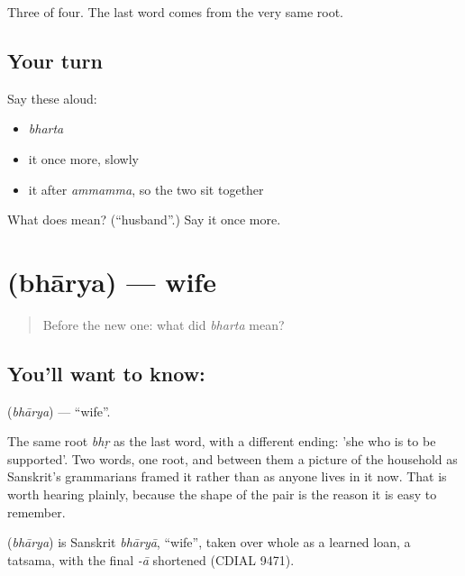 \begin{grammarlens}[title={What you've built}]
Three of four. The last word comes from the very same root.
\end{grammarlens}

\subsection*{Your turn}
Say these aloud:

\begin{itemize}
\raggedright
  \item \emph{bharta}
  \item it once more, slowly
  \item it after \emph{ammamma}, so the two sit together
\end{itemize}

\begin{tcolorbox}[breakable,colback=teal!4,colframe=teal!35!black,title={Before you move on}]
What does  mean? (\textquotedblleft{}husband\textquotedblright{}.) Say it once more.
\end{tcolorbox}
\section[\texorpdfstring{\te{భార్య} (bhārya)}{భార్య (bhārya)}]{ (bhārya) — wife}

\label{lesson:TE-C45-wife}



\begin{quote}
Before the new one: what did \emph{bharta} mean?
\end{quote}

\subsection*{You'll want to know: }
\textbf{} (\emph{bhārya}) — \textquotedblleft{}wife\textquotedblright{}.

The same root \emph{bhṛ} as the last word, with a different ending: 'she who is to be supported'. Two words, one root, and between them a picture of the household as Sanskrit's grammarians framed it rather than as anyone lives in it now. That is worth hearing plainly, because the shape of the pair is the reason it is easy to remember.

\begin{cousinweb}
\textbf{} (\emph{bhārya}) is Sanskrit \emph{bhāryā}, \textquotedblleft{}wife\textquotedblright{}, taken over whole as a learned loan, a tatsama, with the final \emph{-ā} shortened (CDIAL 9471).
\end{cousinweb}

